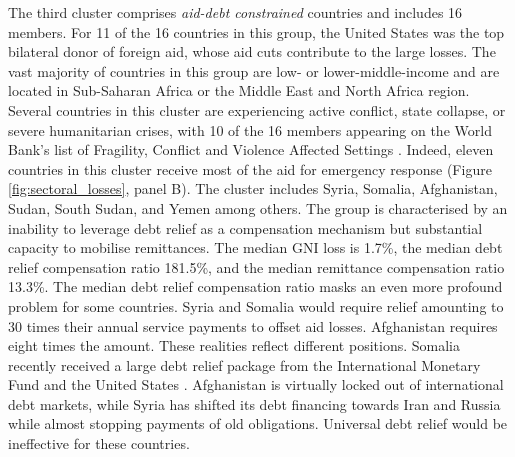 \documentclass[fleqn,10pt,twocolumn]{wlscirep}
\begin{document}
{%
{
The third cluster comprises \textit{aid-debt constrained} countries and includes 16 members. For 11 of the 16 countries in this group, the United States was the top bilateral donor of foreign aid, whose aid cuts contribute to the large losses. The vast majority of countries in this group are low- or lower-middle-income and are located in Sub-Saharan Africa or the Middle East and North Africa region. Several countries in this cluster are experiencing active conflict, state collapse, or severe humanitarian crises, with 10 of the 16 members appearing on the World Bank's list of Fragility, Conflict and Violence Affected Settings \cite{worldbank2025fcs}. Indeed, eleven countries in this cluster receive most of the aid for emergency response (Figure \ref{fig:sectoral_losses}, panel B). The cluster includes Syria, Somalia, Afghanistan, Sudan, South Sudan, and Yemen among others. The group is characterised by an inability to leverage debt relief as a compensation mechanism but substantial capacity to mobilise remittances. The median GNI loss is 1.7\%, the median debt relief compensation ratio 181.5\%, and the median remittance compensation ratio 13.3\%. The median debt relief compensation ratio masks an even more profound problem for some countries. Syria and Somalia would require relief amounting to 30 times their annual service payments to offset aid losses. Afghanistan requires eight times the amount. These realities reflect different positions. Somalia recently received a large debt relief package from the International Monetary Fund and the United States \cite{IMF2023SomaliaDebtRelief}. Afghanistan is virtually locked out of international debt markets, while Syria has shifted its debt financing towards Iran and Russia while almost stopping payments of old obligations. Universal debt relief would be ineffective for these countries.

}}
\end{document}
